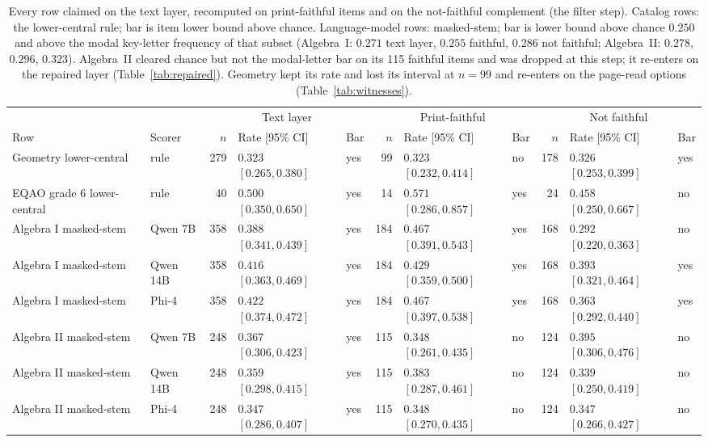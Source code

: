 \begin{table}[t]
  \caption{Every row claimed on the text layer, recomputed on print-faithful items and on the not-faithful complement (the filter step). Catalog rows: the lower-central rule; bar is item lower bound above chance. Language-model rows: masked-stem; bar is lower bound above chance $0.250$ and above the modal key-letter frequency of that subset (Algebra~I: $0.271$ text layer, $0.255$ faithful, $0.286$ not faithful; Algebra~II: $0.278$, $0.296$, $0.323$). Algebra~II cleared chance but not the modal-letter bar on its 115 faithful items and was dropped at this step; it re-enters on the repaired layer (Table~\ref{tab:repaired}). Geometry kept its rate and lost its interval at $n=99$ and re-enters on the page-read options (Table~\ref{tab:witnesses}).}
  \label{tab:faithful}
  \centering
  \scriptsize
  \begin{tabular}{l l r l l r l l r l l}
    \toprule
    & & \multicolumn{3}{c}{Text layer} & \multicolumn{3}{c}{Print-faithful} & \multicolumn{3}{c}{Not faithful} \\
    Row & Scorer & $n$ & Rate [95\% CI] & Bar & $n$ & Rate [95\% CI] & Bar & $n$ & Rate [95\% CI] & Bar \\
    \midrule
    Geometry lower-central & rule & 279 & $0.323$ $[0.265, 0.380]$ & yes & 99 & $0.323$ $[0.232, 0.414]$ & no & 178 & $0.326$ $[0.253, 0.399]$ & yes \\
    EQAO grade 6 lower-central & rule & 40 & $0.500$ $[0.350, 0.650]$ & yes & 14 & $0.571$ $[0.286, 0.857]$ & yes & 24 & $0.458$ $[0.250, 0.667]$ & no \\
    Algebra I masked-stem & Qwen 7B & 358 & $0.388$ $[0.341, 0.439]$ & yes & 184 & $0.467$ $[0.391, 0.543]$ & yes & 168 & $0.292$ $[0.220, 0.363]$ & no \\
    Algebra I masked-stem & Qwen 14B & 358 & $0.416$ $[0.363, 0.469]$ & yes & 184 & $0.429$ $[0.359, 0.500]$ & yes & 168 & $0.393$ $[0.321, 0.464]$ & yes \\
    Algebra I masked-stem & Phi-4 & 358 & $0.422$ $[0.374, 0.472]$ & yes & 184 & $0.467$ $[0.397, 0.538]$ & yes & 168 & $0.363$ $[0.292, 0.440]$ & yes \\
    Algebra II masked-stem & Qwen 7B & 248 & $0.367$ $[0.306, 0.423]$ & yes & 115 & $0.348$ $[0.261, 0.435]$ & no & 124 & $0.395$ $[0.306, 0.476]$ & no \\
    Algebra II masked-stem & Qwen 14B & 248 & $0.359$ $[0.298, 0.415]$ & yes & 115 & $0.383$ $[0.287, 0.461]$ & no & 124 & $0.339$ $[0.250, 0.419]$ & no \\
    Algebra II masked-stem & Phi-4 & 248 & $0.347$ $[0.286, 0.407]$ & yes & 115 & $0.348$ $[0.270, 0.435]$ & no & 124 & $0.347$ $[0.266, 0.427]$ & no \\
    \bottomrule
  \end{tabular}
\end{table}


